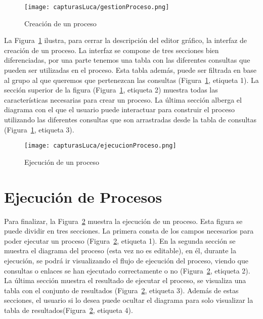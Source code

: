 \begin{figure}[H]
	\centering
	\texttt{[image: capturasLuca/gestionProceso.png]}
	\caption{Creación de un proceso}
	\label{fig:gestionProceso}
\end{figure}

La Figura~\ref{fig:gestionProceso} ilustra, para cerrar la descripción del editor gráfico, la interfaz de creación de un proceso. La interfaz se compone de tres secciones bien diferenciadas, por una parte tenemos una tabla con las diferentes consultas que pueden ser utilizadas en el proceso. Esta tabla además, puede ser filtrada en base al grupo al que queremos que pertenezcan las consultas (Figura~\ref{fig:gestionProceso}, etiqueta 1). La sección superior de la figura (Figura~\ref{fig:gestionProceso}, etiqueta 2) muestra todas las características necesarias para crear un proceso. La última sección alberga el diagrama con el que el usuario puede interactuar para construir el proceso utilizando las diferentes consultas que son arrastradas desde la tabla de consultas (Figura~\ref{fig:gestionProceso}, etiqueta 3).

\begin{figure}[H]
	\centering
	\texttt{[image: capturasLuca/ejecucionProceso.png]}
	\caption{Ejecución de un proceso}
	\label{fig:ejecucionProceso}
\end{figure}

\section{Ejecución de Procesos}



Para finalizar, la Figura~\ref{fig:ejecucionProceso} muestra la ejecución de un proceso. Esta figura se puede dividir en tres secciones. La primera consta de los campos necesarios para poder ejecutar un proceso (Figura~\ref{fig:ejecucionProceso}, etiqueta 1). En la segunda sección se muestra el diagrama del proceso (esta vez no es editable), en él, durante la ejecución, se podrá ir visualizando el flujo de ejecución del proceso, viendo que consultas o enlaces se han ejecutado correctamente o no (Figura~\ref{fig:ejecucionProceso}, etiqueta 2). La última sección muestra el resultado de ejecutar el proceso, se visualiza una tabla con el conjunto de resultados (Figura~\ref{fig:ejecucionProceso}, etiqueta 3). Además de estas secciones, el usuario si lo desea puede ocultar el diagrama para solo visualizar la tabla de resultados(Figura~\ref{fig:ejecucionProceso}, etiqueta 4).




